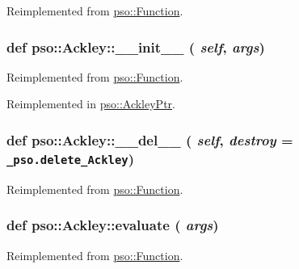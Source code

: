 Reimplemented from \hyperlink{classpso_1_1Function_959f07a6de4f333461fdb0261e6c25ae}{pso::Function}.\hypertarget{classpso_1_1Ackley_df19f3468a7b5b260adffcd134145e24}{
\subsubsection{\setlength{\rightskip}{0pt plus 5cm}def pso::Ackley::\_\-\_\-init\_\-\_\- ( {\em self}, \/   {\em args})}}
\label{classpso_1_1Ackley_df19f3468a7b5b260adffcd134145e24}




Reimplemented from \hyperlink{classpso_1_1Function_6874097c6476dc85af64b40e76a807e9}{pso::Function}.

Reimplemented in \hyperlink{classpso_1_1AckleyPtr_92267323798f30fea8a7d1e807261dc3}{pso::AckleyPtr}.\hypertarget{classpso_1_1Ackley_60113ede99369f390dc78a45e625342c}{
\subsubsection{\setlength{\rightskip}{0pt plus 5cm}def pso::Ackley::\_\-\_\-del\_\-\_\- ( {\em self}, \/   {\em destroy} = {\tt \_\-pso.delete\_\-Ackley})}}
\label{classpso_1_1Ackley_60113ede99369f390dc78a45e625342c}




Reimplemented from \hyperlink{classpso_1_1Function_c80bd40fcf4a956e5732ed099bccc598}{pso::Function}.\hypertarget{classpso_1_1Ackley_bf28e608baadcbc4a9795993584f985b}{
\subsubsection{\setlength{\rightskip}{0pt plus 5cm}def pso::Ackley::evaluate ( {\em args})}}
\label{classpso_1_1Ackley_bf28e608baadcbc4a9795993584f985b}




Reimplemented from \hyperlink{classpso_1_1Function_7c958ea6d942a89ae219b872b4d73541}{pso::Function}.

